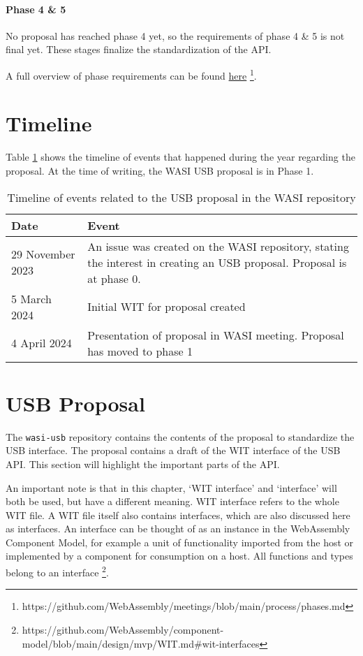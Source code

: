 \paragraph{Phase 4 \& 5}

No proposal has reached phase 4 yet, so the requirements of phase 4 \& 5 is not final yet. These stages finalize the standardization of the API.


A full overview of phase requirements can be found \href{https://github.com/WebAssembly/meetings/blob/main/process/phases.md}{here} \footnote{https://github.com/WebAssembly/meetings/blob/main/process/phases.md}.

\section{Timeline}
Table \ref{tab:wasi_usb_proposal} shows the timeline of events that happened during the year regarding the proposal. At the time of writing, the \acrshort{WASI} \acrshort{USB} proposal is in Phase 1.

\begin{table}[h]
	\centering
	\begin{tabular}{l|p{12cm}}
		\toprule
		\textbf{Date} & \textbf{Event} \\
		\midrule
		29 November 2023 & An issue \cite{wasi_issue_570} was created on the WASI repository, stating the interest in creating an USB proposal. Proposal is at phase 0. \\
		5 March 2024 & Initial WIT for proposal created\\
		4 April 2024 & Presentation \cite{wasi_meeting_notes} of proposal in WASI meeting. Proposal has moved to phase 1 \\
		\bottomrule
	\end{tabular}
	\caption{Timeline of events related to the USB proposal in the WASI repository}
	\label{tab:wasi_usb_proposal}
\end{table}

\section{USB Proposal}
\label{section:usb_proposal}
The \texttt{wasi-usb} repository \cite{wasi_usb} contains the contents of the proposal to standardize the USB interface. The proposal contains a draft of the \acrshort{WIT} interface of the USB API. This section will highlight the important parts of the API.

An important note is that in this chapter, `WIT interface' and `interface' will both be used, but have a different meaning.
WIT interface refers to the whole WIT file.
A WIT file itself also contains interfaces, which are also discussed here as interfaces. An interface can be thought of as an instance in the WebAssembly Component Model, for example a unit of functionality imported from the host or implemented by a component for consumption on a host. All functions and types belong to an interface \footnote{https://github.com/WebAssembly/component-model/blob/main/design/mvp/WIT.md\#wit-interfaces}.

